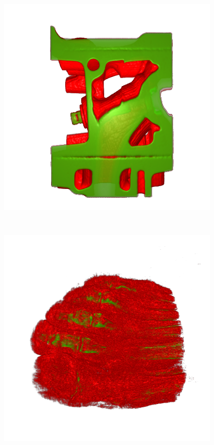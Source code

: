 \begin{figure}
\centering
\begin{minipage}{.15\textwidth}
\includegraphics[width=1\linewidth]{images/engine_naive}
\end{minipage}~
\begin{minipage}{.15\textwidth}
	\includegraphics[width=1\linewidth]{images/foot_naive}

\end{minipage}
\end{figure}
